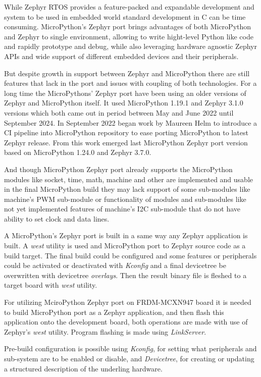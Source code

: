 \documentclass[twoside, 12pt]{article}
\begin{document}
While Zephyr RTOS provides a feature-packed and expandable development and system to be used
in embedded world standard development in C can be time consuming. MicroPython's Zephyr port
brings advantages of both MicroPython and Zephyr to single environment, allowing to write
hight-level Python like code and rapidly prototype and debug, while also leveraging hardware 
agnostic Zephyr APIs and wide support of
different embedded devices and their peripherals.

But despite growth in support between Zephyr and MicroPython there are still features that 
lack in the port and issues with coupling of both technologies. For a long time the 
MicroPythons' Zephyr port have been using an older versions of Zephyr and
MicroPython itself. It used MicroPython 1.19.1 and Zephyr 3.1.0 versions which both came out 
in period between May and June 2022 until September 2024. In September 2022 began work by 
Maureen Helm  to introduce a CI pipeline into MicroPython repository to ease porting 
MicroPython to latest Zephyr release. From this work emerged last MicroPython Zephyr port 
version based on MicroPython 1.24.0 and Zephyr 3.7.0.

And though MicroPython Zephyr port
already supports the MicroPython modules like socket, time, math, machine and other are 
implemented and usable in the final MicroPython build they may lack support of some 
sub-modules like machine's PWM sub-module or functionality of modules and sub-modules like
not yet implemented features of machine's I2C sub-module that do not have ability to set clock and data lines.

A MicroPython's Zephyr port is built in a same way any Zephyr application is built. A 
\textit{west} utility is used and MicroPython port to Zephyr source code as a build target.
The final build could be configured and some features or peripherals could be activated or 
deactivated with \textit{Kconfig} and a final devicetree be overwritten with devicetree 
\textit{overlays}. Then the result binary file is fleshed to a target board with \textit{west}
utility.

For utilizing MciroPython Zephyr port on FRDM-MCXN947 board it is needed to build MicroPython 
port as a Zephyr application, and then flash this application onto the development board, 
both operations are made with use of Zephyr's \textit{west} utility. Program flashing is made using \textit{LinkServer}.

Pre-build configuration is possible using \textit{Kconfig}, for setting what peripherals and sub-system are to be enabled or disable, and \textit{Devicetree}, for creating or updating a structured description of the underling hardware.
\end{document}
